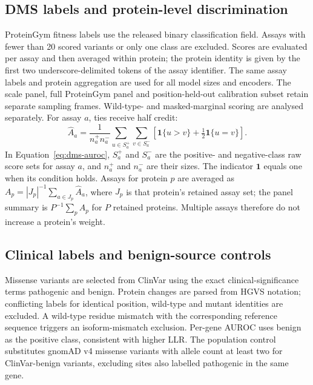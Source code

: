 \subsection{DMS labels and protein-level discrimination}
ProteinGym fitness labels use the released binary classification field. Assays with fewer than 20 scored variants or only one class are excluded. Scores are evaluated per assay and then averaged within protein; the protein identity is given by the first two underscore-delimited tokens of the assay identifier. The same assay labels and protein aggregation are used for all model sizes and encoders. The scale panel, full ProteinGym panel and position-held-out calibration subset retain separate sampling frames. Wild-type- and masked-marginal scoring are analysed separately.
For assay $a$, ties receive half credit:
\begin{equation}\label{eq:dms-auroc}
\widehat A_a=\frac{1}{n_a^+n_a^-}\sum_{u\in S_a^+}\sum_{v\in S_a^-}
\left[\mathbf{1}\{u>v\}+\tfrac12\mathbf{1}\{u=v\}\right].
\end{equation}
In Equation~\ref{eq:dms-auroc}, $S_a^+$ and $S_a^-$ are the positive- and
negative-class raw score sets for assay $a$, and $n_a^+$ and $n_a^-$ are
their sizes. The indicator $\mathbf{1}$ equals one when its condition
holds. Assays for protein $p$ are averaged as
$A_p=|J_p|^{-1}\sum_{a\in J_p}\widehat A_a$, where $J_p$ is that protein's
retained assay set; the panel summary is $P^{-1}\sum_p A_p$ for $P$
retained proteins. Multiple assays therefore do not increase a protein's
weight.

\subsection{Clinical labels and benign-source controls}
Missense variants are selected from ClinVar using the exact clinical-significance terms pathogenic and benign. Protein changes are parsed from HGVS notation; conflicting labels for identical position, wild-type and mutant identities are excluded. A wild-type residue mismatch with the corresponding reference sequence triggers an isoform-mismatch exclusion. Per-gene AUROC uses benign as the positive class, consistent with higher LLR. The population control substitutes gnomAD v4 missense variants with allele count at least two for ClinVar-benign variants, excluding sites also labelled pathogenic in the same gene.

